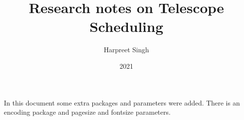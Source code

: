 \documentclass{article}
\title{Research notes on Telescope Scheduling}
\author{Harpreet Singh}
\date{2021}
\begin{document}
\begin{titlepage}
\maketitle
\end{titlepage}

In this document some extra packages and parameters
were added. There is an encoding package
and pagesize and fontsize parameters.
\end{document}
